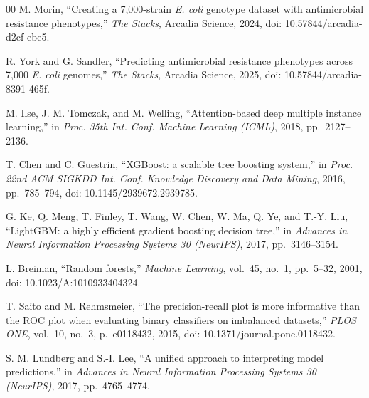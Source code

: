 \documentclass[conference]{IEEEtran}
\begin{document}
\begin{thebibliography}{00}
 M. Morin, ``Creating a 7,000-strain \textit{E. coli} genotype dataset with antimicrobial resistance phenotypes,'' \textit{The Stacks}, Arcadia Science, 2024, doi: 10.57844/arcadia-d2cf-ebe5.

 R. York and G. Sandler, ``Predicting antimicrobial resistance phenotypes across 7,000 \textit{E. coli} genomes,'' \textit{The Stacks}, Arcadia Science, 2025, doi: 10.57844/arcadia-8391-465f.

 M. Ilse, J. M. Tomczak, and M. Welling, ``Attention-based deep multiple instance learning,'' in \textit{Proc. 35th Int. Conf. Machine Learning (ICML)}, 2018, pp.~2127--2136.

 T. Chen and C. Guestrin, ``XGBoost: a scalable tree boosting system,'' in \textit{Proc. 22nd ACM SIGKDD Int. Conf. Knowledge Discovery and Data Mining}, 2016, pp.~785--794, doi: 10.1145/2939672.2939785.

 G. Ke, Q. Meng, T. Finley, T. Wang, W. Chen, W. Ma, Q. Ye, and T.-Y. Liu, ``LightGBM: a highly efficient gradient boosting decision tree,'' in \textit{Advances in Neural Information Processing Systems 30 (NeurIPS)}, 2017, pp.~3146--3154.

 L. Breiman, ``Random forests,'' \textit{Machine Learning}, vol.~45, no.~1, pp.~5--32, 2001, doi: 10.1023/A:1010933404324.

 T. Saito and M. Rehmsmeier, ``The precision-recall plot is more informative than the ROC plot when evaluating binary classifiers on imbalanced datasets,'' \textit{PLOS ONE}, vol.~10, no.~3, p.~e0118432, 2015, doi: 10.1371/journal.pone.0118432.

 S. M. Lundberg and S.-I. Lee, ``A unified approach to interpreting model predictions,'' in \textit{Advances in Neural Information Processing Systems 30 (NeurIPS)}, 2017, pp.~4765--4774.

\end{thebibliography}
\end{document}
